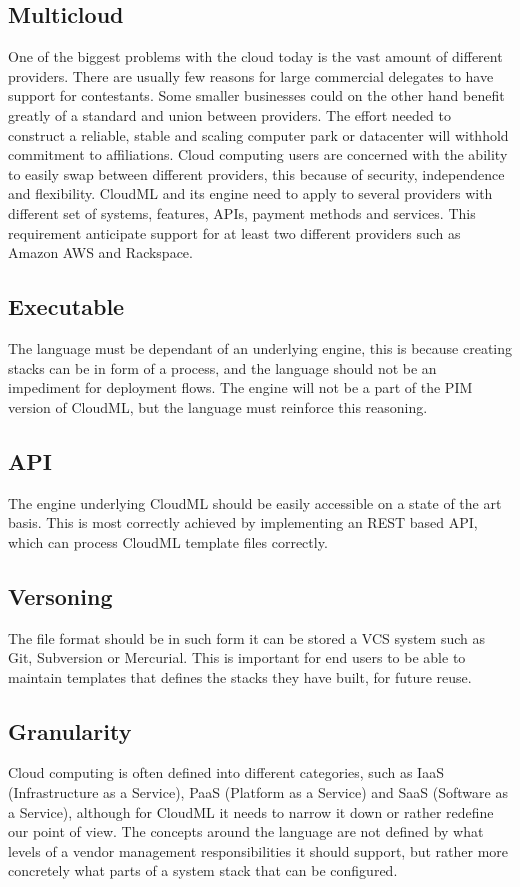 \subsection{Multicloud}
One of the biggest problems with the cloud today is the vast amount of different providers. 
There are usually few reasons for large commercial delegates to have support for contestants. 
Some smaller businesses could on the other hand benefit greatly of a standard and union between providers.
The effort needed to construct a reliable, stable and scaling computer park or datacenter will withhold commitment to affiliations. 
Cloud computing users are concerned with the ability to easily swap between different providers, this because of security, 
independence and flexibility. CloudML and its engine need to apply to several providers with different set of systems, 
features, APIs, payment methods and services. This requirement anticipate support for at least two different providers such as Amazon AWS and Rackspace.

\subsection{Executable}
The language must be dependant of an underlying engine, this is because creating stacks can be in form of a process, 
and the language should not be an impediment for deployment flows. The engine will not be a part of the PIM version of CloudML, 
but the language must reinforce this reasoning.

\subsection{API}
The engine underlying CloudML should be easily accessible on a state of the art basis. 
This is most correctly achieved by implementing an REST based API, which can process CloudML template files correctly. 

\subsection{Versoning}
The file format should be in such form it can be stored a VCS system such as Git, Subversion or Mercurial. 
This is important for end users to be able to maintain templates that defines the stacks they have built, for future reuse.

\subsection{Granularity}
Cloud computing is often defined into different categories, such as IaaS (Infrastructure as a Service), 
PaaS (Platform as a Service) and SaaS (Software as a Service), although for CloudML it needs to narrow it down or rather redefine our point of view.
The concepts around the language are not defined by what levels of a vendor management responsibilities it should support, 
but rather more concretely what parts of a system stack that can be configured.


